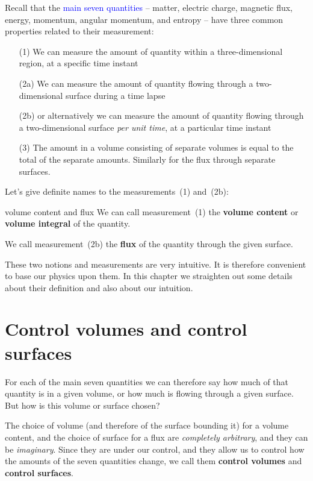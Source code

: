 \documentclass[a4paper,12pt,%
onecolumn,oneside,%
british%
]{memoir}
\renewcommand*{\|}[1][]{\nonscript\:#1\vert\nonscript\:\mathopen{}}
\newcommand*{\sect}{\S}%
\renewcommand*{\autoref}[2]{\sidepar{\vspace{-1ex}\footnotesize{\color{blue}\faIcon{%
angle-right%
}\enspace\sect\,\ref{#1} page\,\pageref{#1}}}\textcolor{blue}{#2}}
\begin{document}
Recall that the \autoref{cha:stuff}{main seven quantities} -- matter, electric charge, magnetic flux, energy, momentum, angular momentum, and entropy -- have three common properties related to their measurement:
\begin{enumerate}
\item[(1)] We can measure the amount of quantity within a three-dimensional region, at a specific time instant
\item[(2a)] We can measure the amount of quantity flowing through a two-dimensional surface during a time lapse\textellipsis
\item[(2b)] \textellipsis or alternatively we can measure the amount of quantity flowing through a two-dimensional surface \emph{per unit time}, at a particular time instant
\item[(3)]\label{item:extensivity}The amount in a volume consisting of separate volumes is equal to the total of the separate amounts. Similarly for the flux through separate surfaces.
\end{enumerate}

Let's give definite names to the measurements~(1) and~(2b):
\begin{definition}{volume content and flux}
  We can call measurement~(1) the \textbf{volume content} or \textbf{volume integral} of the quantity.

  \smallskip

  We call measurement~(2b) the \textbf{flux} of the quantity through the given surface.%
\end{definition}

\smallskip

These two notions and measurements are very intuitive. It is therefore convenient to base our physics upon them. In this chapter we straighten out some details about their definition and also about our intuition.

\section{Control volumes and control surfaces}
\label{sec:choice_surfaces}

For each of the main seven quantities we can therefore say how much of that quantity is in a given volume, or how much is flowing through a given surface. But how is this volume or surface chosen?

The choice of volume (and therefore of the surface bounding it) for a volume content, and the choice of surface for a flux are \emph{completely arbitrary}, and they can be \emph{imaginary}. Since they are under our control, and they allow us to control how the amounts of the seven quantities change, we call them \textbf{control volumes} and \textbf{control surfaces}.
\end{document}
